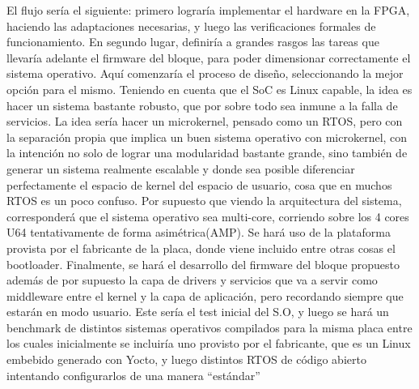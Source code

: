 \documentclass[a4,a4paper]{article}
\begin{document}
\par El flujo sería el siguiente: primero lograría implementar el hardware en la FPGA, haciendo las adaptaciones necesarias, y luego las verificaciones formales de funcionamiento. En segundo lugar, definiría a grandes rasgos las tareas que llevaría adelante el firmware del bloque, para poder dimensionar correctamente el sistema operativo. Aquí comenzaría el proceso de diseño, seleccionando la mejor opción para el mismo. Teniendo en cuenta que el SoC es Linux capable, la idea es hacer un sistema bastante robusto, que por sobre todo sea inmune a la falla de servicios. La idea  sería hacer un microkernel, pensado como un RTOS, pero con la separación propia que implica un buen sistema operativo con microkernel, con la intención no solo de lograr una modularidad bastante grande, sino también de generar un sistema realmente escalable y donde sea posible diferenciar perfectamente el espacio de kernel del espacio de usuario, cosa que en muchos RTOS es un poco confuso. Por supuesto que viendo la arquitectura del sistema, corresponderá que el sistema operativo sea multi-core, corriendo sobre los 4 cores U64 tentativamente de forma asimétrica(AMP). Se hará uso de la plataforma provista por el fabricante de la placa, donde viene incluido entre otras cosas el bootloader. Finalmente, se hará el desarrollo del firmware del bloque propuesto además de por supuesto la capa de drivers y servicios que va a servir como middleware entre el kernel y la capa de aplicación, pero recordando siempre que estarán en modo usuario. Este sería el test inicial del S.O, y luego se hará un benchmark de distintos sistemas operativos compilados para la misma placa entre los cuales inicialmente se incluiría uno provisto por el fabricante, que es un Linux embebido generado con Yocto, y luego distintos RTOS de código abierto intentando configurarlos de una manera ``estándar'' 

\pagebreak
\newpage




\listoffigures
\end{document}
